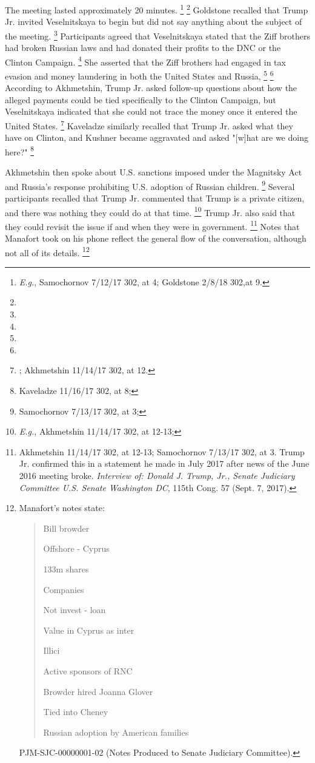 The meeting lasted approximately 20 minutes.%
\footnote{\textit{E.g.}, Samochornov 7/12/17 302, at 4; Goldstone 2/8/18 302,at 9.}
\footnote{}
 Goldstone recalled that Trump Jr. invited Veselnitskaya to begin but did not say anything about the subject of the meeting.%
\footnote{}
Participants agreed that Veselnitskaya stated that the Ziff brothers had broken Russian laws and had donated their profits to the DNC or the Clinton Campaign.%
\footnote{}
She asserted that the Ziff brothers had engaged in tax evasion and money laundering in both the United States and Russia,%
\footnote{}
\footnote{}
According to Akhmetshin, Trump Jr. asked follow-up questions about how the alleged payments could be tied specifically to the Clinton Campaign, but Veselnitskaya indicated that she could not trace the money once it entered the United States.%
\footnote{; Akhmetshin 11/14/17 302, at 12.}
Kaveladze similarly recalled that Trump Jr. asked what they have on Clinton, and Kushner became aggravated and asked "[w]hat are we doing here?"%
\footnote{Kaveladze 11/16/17 302, at 8;
}

Akhmetshin then spoke about U.S. sanctions imposed under the Magnitsky Act and Russia's response prohibiting U.S. adoption of Russian children.%
\footnote{Samochornov 7/13/17 302, at 3;
}
Several participants recalled that Trump Jr. commented that Trump is a private citizen, and there was nothing they could do at that time.%
\footnote{\textit{E.g.}, Akhmetshin 11/14/17 302, at 12-13;
}
Trump Jr. also said that they could revisit the issue if and when they were in government.%
\footnote{Akhmetshin 11/14/17 302, at 12-13;
Samochornov 7/13/17 302, at 3.
Trump Jr. confirmed this in a statement he made in July 2017 after news of the June 2016 meeting broke.
\textit{Interview of: Donald J. Trump, Jr., Senate Judiciary Committee U.S. Senate Washington DC}, 115th Cong. 57 (Sept. 7, 2017).}
Notes that Manafort took on his phone reflect the general flow of the conversation, although not all of its details.%
\footnote{Manafort’s notes state:

\begin{quote}
Bill browder

Offshore - Cyprus

133m shares

Companies

Not invest - loan

Value in Cyprus as inter

Illici

Active sponsors of RNC

Browder hired Joanna Glover

Tied into Cheney

Russian adoption by American families
\end{quote}

PJM-SJC-00000001-02 (Notes Produced to Senate Judiciary Committee).}

